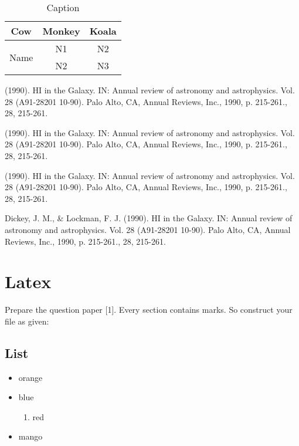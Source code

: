 \documentclass[12pt]{article}
\begin{document}
\begin{table}[]
    \centering
    \begin{tabular}{|c|c|c|}
        \hline
        Cow                   & Monkey & Koala \\
        \hline
        \multirow{2}{*}{Name} & N1     & N2    \\
        \cline{2-3}           & N2     & N3    \\
        \hline
    \end{tabular}
    \caption{Caption}
    \label{tab:my_label2}
\end{table}
\begin{thebibliography}{100}
    (1990). HI in the Galaxy. IN: Annual review of astronomy and astrophysics. Vol. 28 (A91-28201 10-90). Palo Alto, CA, Annual Reviews, Inc., 1990, p. 215-261., 28, 215-261.

    (1990). HI in the Galaxy. IN: Annual review of astronomy and astrophysics. Vol. 28 (A91-28201 10-90). Palo Alto, CA, Annual Reviews, Inc., 1990, p. 215-261., 28, 215-261.
\end{thebibliography}

\begin{thebibliography}{100}
    (1990). HI in the Galaxy. IN: Annual review of astronomy and astrophysics. Vol. 28 (A91-28201 10-90). Palo Alto, CA, Annual Reviews, Inc., 1990, p. 215-261., 28, 215-261.

    Dickey, J. M., \& Lockman, F. J. (1990). HI in the Galaxy. IN: Annual review of astronomy and astrophysics. Vol. 28 (A91-28201 10-90). Palo Alto, CA, Annual Reviews, Inc., 1990, p. 215-261., 28, 215-261.
\end{thebibliography}



\section{Latex}
Prepare the question paper [1]. Every section contains marks. So construct your file as given:

\subsection{List}
\begin{itemize}
    \item orange
    \item blue
          \begin{enumerate}
              \item red
          \end{enumerate}
    \item mango
\end{itemize}
\end{document}
